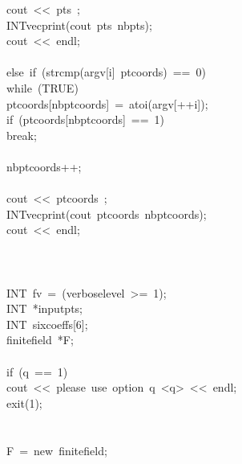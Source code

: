 \begin{tabbing}
\>\>\>cout\ <<\ pts\ ;\\[0pt]
\>\>\>INTvecprint(cout\ pts\ nbpts);\\[0pt]
\>\>\>cout\ <<\ endl;\\[0pt]
\>\>\>\\[0pt]
\>\>else\ if\ (strcmp(argv[i]\ ptcoords)\ ==\ 0)\ \\[0pt]
\>\>\>while\ (TRUE)\ \\[0pt]
\>\>\>\>ptcoords[nbptcoords]\ =\ atoi(argv[++i]);\\[0pt]
\>\>\>\>if\ (ptcoords[nbptcoords]\ ==\ 1)\ \\[0pt]
\>\>\>\>\>break;\\[0pt]
\>\>\>\>\>\\[0pt]
\>\>\>\>nbptcoords++;\\[0pt]
\>\>\>\>\\[0pt]
\>\>\>cout\ <<\ ptcoords\ ;\\[0pt]
\>\>\>INTvecprint(cout\ ptcoords\ nbptcoords);\\[0pt]
\>\>\>cout\ <<\ endl;\\[0pt]
\>\>\>\\[0pt]
\>\>\\[0pt]
\\[0pt]
\>INT\ fv\ =\ (verboselevel\ >=\ 1);\\[0pt]
\>INT\ *inputpts;\\[0pt]
\>INT\ sixcoeffs[6];\\[0pt]
\>finitefield\ *F;\\[0pt]
\\[0pt]
\>if\ (q\ ==\ 1)\ \\[0pt]
\>\>cout\ <<\ please\ use\ option\ q\ <q>\ <<\ endl;\\[0pt]
\>\>exit(1);\\[0pt]
\>\>\\[0pt]
\\[0pt]
\>F\ =\ new\ finitefield;\\[0pt]
\\[0pt]

\end{tabbing}
